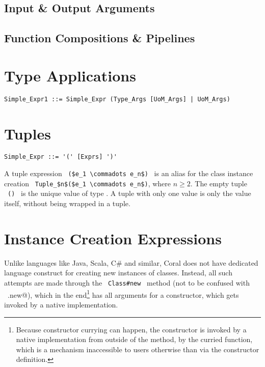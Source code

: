\subsection{Input \& Output Arguments}
\label{sec:io-arguments}

\subsection{Function Compositions \& Pipelines}






\section{Type Applications}
\label{sec:type-applications}

\syntax\begin{lstlisting}
Simple_Expr1 ::= Simple_Expr (Type_Args [UoM_Args] | UoM_Args)
\end{lstlisting}






\section{Tuples}
\label{sec:tuples}

\syntax\begin{lstlisting}
Simple_Expr ::= '(' [Exprs] ')'
\end{lstlisting}

A tuple expression ~\lstinline!($e_1 \commadots e_n$)!~ is an alias for the class instance creation ~\lstinline!Tuple_$n$($e_1 \commadots e_n$)!, where $n \geq 2$. The empty tuple ~\lstinline!()!~ is the unique value of type . A tuple with only one value is only the value itself, without being wrapped in a tuple. 






\section{Instance Creation Expressions}
\label{sec:instance-creation-exprs}

Unlike languages like Java, Scala, C\# and similar, Coral does not have dedicated language construct for creating new instances of classes. Instead, all such attempts are made through the ~\lstinline!Class#new!~ method (not to be confused with ~\lstinline@Class.new@), which in the end\footnote{Because constructor currying can happen, the constructor is invoked by a native implementation from outside of the  method, by the curried function, which is a mechanism inaccessible to users otherwise than via the constructor definition.} has all arguments for a constructor, which gets invoked by a native implementation. 






